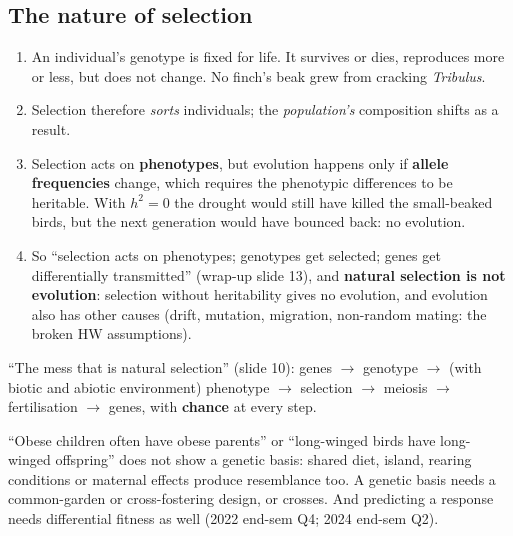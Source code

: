 \subsection{The nature of selection}
\begin{chain}
\begin{enumerate}
\item An individual's genotype is fixed for life. It survives or dies, reproduces more or less, but does not change.
No finch's beak grew from cracking \emph{Tribulus}.
\item Selection therefore \emph{sorts} individuals; the \emph{population's} composition shifts as a result.
\item Selection acts on \textbf{phenotypes}, but evolution happens only if \textbf{allele frequencies} change, which
requires the phenotypic differences to be heritable. With $h^2=0$ the drought would still have killed the small-beaked
birds, but the next generation would have bounced back: no evolution.
\item So ``selection acts on phenotypes; genotypes get selected; genes get differentially transmitted'' (wrap-up slide 13),
and \textbf{natural selection is not evolution}: selection without heritability gives no evolution, and evolution also has
other causes (drift, mutation, migration, non-random mating: the broken HW assumptions).
\end{enumerate}
\end{chain}
``The mess that is natural selection'' (slide 10): genes $\to$ genotype $\to$ (with biotic and abiotic environment)
phenotype $\to$ selection $\to$ meiosis $\to$ fertilisation $\to$ genes, with \textbf{chance} at every step.

\begin{trap}
``Obese children often have obese parents'' or ``long-winged birds have long-winged offspring'' does not show a genetic
basis: shared diet, island, rearing conditions or maternal effects produce resemblance too. A genetic basis needs a
common-garden or cross-fostering design, or crosses. And predicting a response needs differential fitness as well
(2022 end-sem Q4; 2024 end-sem Q2).
\end{trap}

